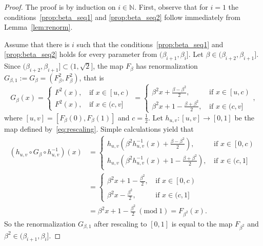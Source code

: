 \documentclass[10pt,reqno]{amsart}
\theoremstyle{plain}
\theoremstyle{assumption}
\theoremstyle{notation}
\theoremstyle{claim}
\theoremstyle{conj}
\theoremstyle{theorem}
\theoremstyle{proposition}
\theoremstyle{corollary}
\newcommand{\Mod}[1]{\ (\mathrm{mod}\ #1)}
\begin{document}
\begin{proof}
The proof is by induction on $i\in\mathbb{N}$. First, observe that for $i=1$ the conditions~\eqref{prop:beta_seq1} and \eqref{prop:beta_seq2} follow immediately from Lemma~\ref{lem:renorm}.

Assume that there is $i$ such that the conditions~\eqref{prop:beta_seq1} and \eqref{prop:beta_seq2} holds for every parameter from $(\beta_{i+1},\beta_i]$. Let $\beta\in(\beta_{i+2},\beta_{i+1}]$. Since $(\beta_{i+2},\beta_{i+1}]\subset(1,\sqrt{2}]$, the map $F_{\beta}$ has renormalization $G_{\beta,1}:=G_{\beta}=(F^2_{\beta},F^2_{\beta})$, that is
$$
G_{\beta}(x)=
\begin{cases}F^2 (x),\,&\text{if 
		$x\in\left[u,c\right)$}\\
	F^2 (x),\,&\text{if $x\in (c,v]$}\end{cases}
=
\begin{cases}\beta^2x+\frac{\beta-\beta^2}{2},\,&\text{if 
		$x\in\left[u,c\right)$}\\
	\beta^2x+1-\frac{\beta+\beta^2}{2},\,&\text{if $x\in (c,v]$}\end{cases},
$$
where $[u,v]=[F_{\beta}(0),F_{\beta}(1)]$ and $c=\frac{1}{2}$. Let $h_{u,v}\colon[u,v]\to[0,1]$ be the map defined by~\eqref{eq:rescaling}. Simple calculations yield that 
$$
\begin{aligned}
\left(h_{u,v}\circ G_{\beta}\circ h^{-1}_{u,v}\right)(x)&=
\begin{cases}h_{u,v}\left(\beta^2h_{u,v}^{-1}(x)+\frac{\beta-\beta^2}{2}\right),\,&\text{if 
		$x\in\left[0,c\right)$}\\
	h_{u,v}\left(\beta^2h_{u,v}^{-1}(x)+1-\frac{\beta+\beta^2}{2}\right),\,&\text{if $x\in (c,1]$}\end{cases}\\
    &=
\begin{cases}\beta^2x+1-\frac{\beta^2}{2},\,&\text{if 
		$x\in\left[0,c\right)$}\\
	\beta^2x-\frac{\beta^2}{2},\,&\text{if $x\in (c,1]$}\end{cases}\\
    &=\beta^2 x+1-\frac{\beta^2}{2}\Mod{1}=F_{\beta^2}(x).
\end{aligned}
$$
So the renormalization $G_{\beta,1}$ after rescaling to $[0,1]$ is equal to the map $F_{\beta^2}$ and $\beta^2\in(\beta_{i+1},\beta_i]$.


\end{proof}
\end{document}
